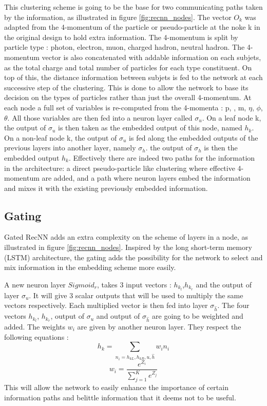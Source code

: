 This clustering scheme is going to be the base for two communicating paths taken by the information, as illustrated in figure \ref{fig:recnn_nodes}.
The vector $O_k$ was adapted from the 4-momentum of the particle or pseudo-particle at the noke k in the original design to hold extra information. The 4-momentum is split by particle type : photon, electron, muon, charged hadron, neutral hadron. The 4-momentum vector is also concatenated with addable information on each subjets, as the total charge and total number of particles for each type constituent. On top of this, the distance information between subjets is fed to the network at each successive step of the clustering. This is done to allow the network to base its decision on the types of particles rather than just the overall 4-momentum. 
At each node a full set of variables is re-computed from the 4-momenta : p, \pt, m, $\eta$, $\phi$, $\theta$. All those variables are then fed into a neuron layer called $\sigma_{u}$.
On a leaf node k, the output of $\sigma_{u}$ is then taken as the embedded output of this node, named $h_k$.
On a non-leaf node k, the output of $\sigma_{u}$ is fed along the embedded outputs of the previous layers into another layer, namely $\sigma_h$. the output of $\sigma_h$ is then the embedded output $h_k$.
Effectively there are indeed two paths for the information in the architecture: a direct pseudo-particle like clustering where effective 4-momentum are added, and a path where neuron layers embed the information and mixes it with the existing previously embedded information.

\subsection{Gating}

Gated RecNN adds an extra complexity on the scheme of layers in a node, as illustrated in figure \ref{fig:recnn_nodes}. Inspired by the long short-term memory (LSTM) architecture, the gating adds the possibility for the network to select and mix information in the embedding scheme more easily. 

A new neuron layer $Sigmoid_r$, takes 3 input vectors : $h_k_l$,$h_k_r$ and the output of layer $\sigma_u$. It will give 3 scalar outputs that will be used to multiply the same vectors respectively. Each multiplied vector is then fed into layer $\sigma_\hat{h}$. 
The four vectors $h_k_l$, $h_k_r$, output of $\sigma_u$ and output of $\sigma_\hat{h}$ are going to be weighted and added. The weights $w_i$ are given by another neuron layer. They respect the following equations :
\begin{equation}    
    h_{k} = \sum_{n_{i}=h_{kL},h_{kR},u,\hat{h}} w_{i}n_{i}
\end{equation}
\begin{equation}
    w_{i} = \frac{e^{Z_i}}{\sum_{j=1}^{K}e^{Z_j}}
\end{equation}
This will allow the network to easily enhance the importance of certain information paths and belittle information that it deems not to be useful.


